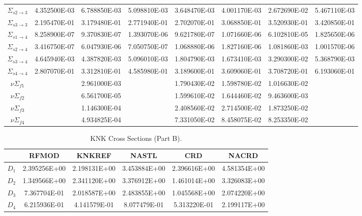 \begin{landscape}
\begin{table}
\begin{center}
\begin{tabular}{cccccccc}
          $\Sigma_{s 2\rightarrow 3}$&4.352500E-03&6.788850E-03&5.098810E-03&3.648470E-03&4.001170E-03&2.672690E-02&5.467110E-03\\
          $\Sigma_{s 3\rightarrow 3}$&2.195470E-01&3.179480E-01&2.771940E-01&2.702070E-01&3.068850E-01&3.520930E-01&3.420850E-01\\
          $\Sigma_{s 1\rightarrow 4}$&8.258900E-07&9.370830E-07&1.393070E-06&9.621780E-07&1.071660E-06&6.102810E-05&1.825650E-06\\
          $\Sigma_{s 2\rightarrow 4}$&3.416750E-07&6.047930E-06&7.050750E-07&1.068880E-06&1.827160E-06&1.081860E-03&1.001570E-06\\
          $\Sigma_{s 3\rightarrow 4}$&4.645940E-03&4.387820E-03&5.096010E-03&1.804790E-03&1.673410E-03&3.290300E-02&5.368790E-03\\
          $\Sigma_{s 4\rightarrow 4}$&2.807070E-01&3.312810E-01&4.585980E-01&3.189600E-01&3.609060E-01&3.708720E-01&6.193060E-01\\
          $ \nu \Sigma_{f1}$&&2.961000E-03&&1.790430E-02&1.598780E-02&1.016630E-02&\\
          $ \nu \Sigma_{f2}$&&6.561700E-05&&1.599610E-02&1.644460E-02&9.463600E-03&\\
          $ \nu \Sigma_{f3}$&&1.146300E-04&&2.408560E-02&2.714500E-02&1.873250E-02&\\
          $ \nu \Sigma_{f4}$&&4.934825E-04&&7.331050E-02&8.458075E-02&8.253350E-02&\\
          \bottomrule
        \end{tabular}
      \end{center}
    \end{table}
    \begin{table}
      \caption{KNK Cross Sections (Part B).}
      \label{tab:knkxs}
      \begin{center}
        \begin{tabular}{cccccc}
          \toprule
          &RFMOD&KNKREF&NASTL&CRD&NACRD\\
          \midrule
          $D_1$&2.395256E+00&2.198131E+00&3.453884E+00&2.396616E+00&4.581354E+00\\
          $D_2$&1.349566E+00&2.341120E+00&3.376912E+00&1.461014E+00&3.326083E+00\\
          $D_3$&7.367704E-01&2.018587E+00&2.483855E+00&1.045568E+00&2.074220E+00\\
          $D_4$&6.215936E-01&4.141579E-01&8.077479E-01&5.313220E-01&2.199117E+00\\

\end{tabular}
\end{center}
\end{table}
\end{landscape}
